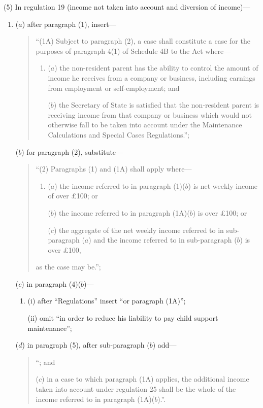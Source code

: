 \documentclass[12pt,a4paper]{article}
\begin{document}
(5) In regulation 19 (income not taken into account and diversion of income)—
\begin{enumerate}\item[]
($a$) after paragraph (1), insert—
\begin{quotation}
“(1A) Subject to paragraph (2), a case shall constitute a case for the purposes of paragraph 4(1) of Schedule 4B to the Act where—
\begin{enumerate}\item[]
($a$) the non-resident parent has the ability to control the amount of income he receives from a company or business, including earnings from employment or self-employment; and

($b$) the Secretary of State is satisfied that the non-resident parent is receiving income from that company or business which would not otherwise fall to be taken into account under the Maintenance Calculations and Special Cases Regulations.”;
\end{enumerate}
\end{quotation}

($b$) for paragraph (2), substitute—
\begin{quotation}
“(2) Paragraphs (1) and (1A) shall apply where—
\begin{enumerate}\item[]
($a$) the income referred to in paragraph (1)($b$)  is net weekly income of over £100; or

($b$) the income referred to in paragraph (1A)($b$)  is over £100; or

($c$) the aggregate of the net weekly income referred to in sub-paragraph ($a$)  and the income referred to in sub-paragraph ($b$)  is over £100,
\end{enumerate}
as the case may be.”;
\end{quotation}

($c$) in paragraph (4)($b$)—
\begin{enumerate}\item[]
(i) after “Regulations” insert “or paragraph (1A)”;

(ii) omit “in order to reduce his liability to pay child support maintenance”;
\end{enumerate}

($d$) in paragraph (5), after sub-paragraph ($b$)  add—
\begin{quotation}
“; and

($c$) in a case to which paragraph (1A) applies, the additional income taken into account under regulation 25 shall be the whole of the income referred to in paragraph (1A)($b$).”.\end{quotation}
\end{enumerate}
\end{document}
